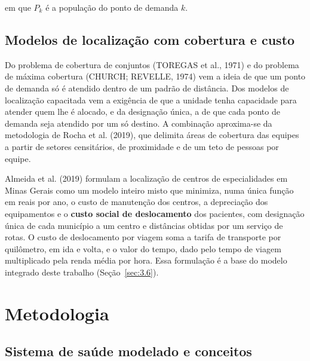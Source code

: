 \documentclass[11pt,a4paper]{article}
\begin{document}
\noindent em que $P_{k}$ é a população do ponto de demanda $k$.

\subsection{Modelos de localização com cobertura e custo}\label{sec:2.4}

Do problema de cobertura de conjuntos (TOREGAS et al., 1971) e do problema de máxima cobertura (CHURCH; REVELLE, 1974) vem a ideia de que um ponto de demanda só é atendido dentro de um padrão de distância. Dos modelos de localização capacitada vem a exigência de que a unidade tenha capacidade para atender quem lhe é alocado, e da designação única, a de que cada ponto de demanda seja atendido por um só destino. A combinação aproxima-se da metodologia de Rocha et al. (2019), que delimita áreas de cobertura das equipes a partir de setores censitários, de proximidade e de um teto de pessoas por equipe.

Almeida et al. (2019) formulam a localização de centros de especialidades em Minas Gerais como um modelo inteiro misto que minimiza, numa única função em reais por ano, o custo de manutenção dos centros, a depreciação dos equipamentos e o \textbf{custo social de deslocamento} dos pacientes, com designação única de cada município a um centro e distâncias obtidas por um serviço de rotas. O custo de deslocamento por viagem soma a tarifa de transporte por quilômetro, em ida e volta, e o valor do tempo, dado pelo tempo de viagem multiplicado pela renda média por hora. Essa formulação é a base do modelo integrado deste trabalho (Seção~\ref{sec:3.6}).


\section{Metodologia}

\subsection{Sistema de saúde modelado e conceitos}\label{sec:3.1}
\end{document}
